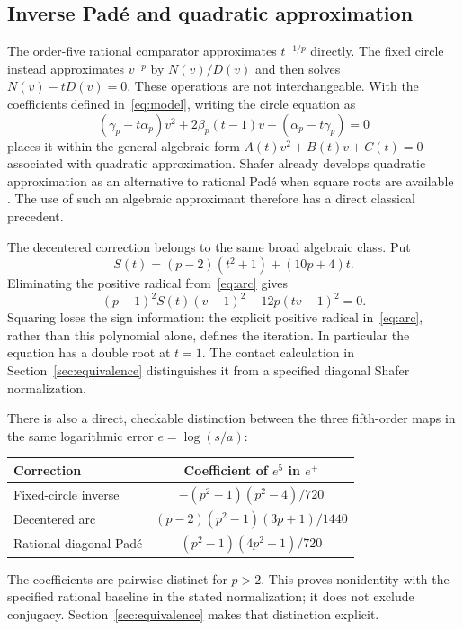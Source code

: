 \documentclass[11pt,a4paper]{article}
\begin{document}
\clearpage
\subsection{Inverse Pad\'e and quadratic approximation}\label{sec:quadraticprior}
The order-five rational comparator approximates $t^{-1/p}$ directly. The fixed circle instead approximates $v^{-p}$ by $N(v)/D(v)$ and then solves $N(v)-tD(v)=0$. These operations are not interchangeable. With the coefficients defined in~\eqref{eq:model}, writing the circle equation as
\[
 (\gamma_p-t\alpha_p)v^2+2\beta_p(t-1)v+(\alpha_p-t\gamma_p)=0
\]
places it within the general algebraic form $A(t)v^2+B(t)v+C(t)=0$ associated with quadratic approximation. Shafer already develops quadratic approximation as an alternative to rational Pad\'e when square roots are available \cite{shafer1974}. The use of such an algebraic approximant therefore has a direct classical precedent.

The decentered correction belongs to the same broad algebraic class. Put
\[
 S(t)=(p-2)(t^2+1)+(10p+4)t.
\]
Eliminating the positive radical from~\eqref{eq:arc} gives
\begin{equation}\label{eq:arcimplicit}
 (p-1)^2 S(t)(v-1)^2-12p(tv-1)^2=0.
\end{equation}
Squaring loses the sign information: the explicit positive radical in~\eqref{eq:arc}, rather than this polynomial alone, defines the iteration. In particular the equation has a double root at $t=1$. The contact calculation in Section~\ref{sec:equivalence} distinguishes it from a specified diagonal Shafer normalization.

There is also a direct, checkable distinction between the three fifth-order maps in the same logarithmic error $e=\log(s/a)$:
\begin{center}\small
\begin{tabular}{@{}lc@{}}\toprule
Correction & Coefficient of $e^5$ in $e^+$\\\midrule
Fixed-circle inverse & $-(p^2-1)(p^2-4)/720$\\
Decentered arc & $(p-2)(p^2-1)(3p+1)/1440$\\
Rational diagonal Pad\'e & $(p^2-1)(4p^2-1)/720$\\\bottomrule
\end{tabular}
\end{center}
The coefficients are pairwise distinct for $p>2$. This proves nonidentity with the specified rational baseline in the stated normalization; it does not exclude conjugacy. Section~\ref{sec:equivalence} makes that distinction explicit.
\end{document}

